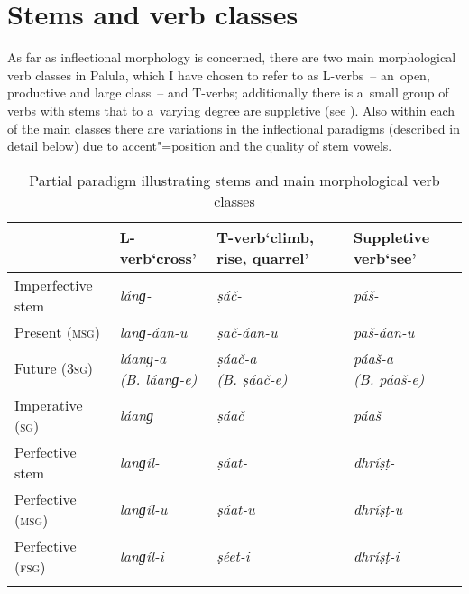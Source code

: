 \section{Stems and verb classes}
\label{sec:8-2}


As far as inflectional morphology is concerned, there are two main morphological verb classes in Palula, which I have chosen to refer to as L-verbs~-- an~open, productive and large class~-- and T-verbs; additionally there is a~small group of verbs with stems that to a~varying degree are suppletive (see ). Also within each of the main classes there are variations in the inflectional paradigms (described in detail below) due to accent"=position and the quality of stem vowels.


\begin{table}[ht]
\caption{Partial paradigm illustrating stems and main morphological verb classes}

\begin{tabularx}{\textwidth}{ l P{20mm} Q P{27mm} }
\lsptoprule
& L-verb\newline `cross' &
T-verb\newline `climb, rise, quarrel' &
Suppletive verb\newline `see'\\\hline
Imperfective stem &
\textit{lánɡ-} &
\textit{ṣáč-} &
\textit{páš-} \\
Present (\textsc{msg}) &
\textit{lanɡ-áan-u} &
\textit{ṣač-áan-u} &
\textit{paš-áan-u} \\
Future (\textsc{3sg}) &
\textit{láanɡ-a\newline (B. láanɡ-e)} &
\textit{ṣáač-a\newline (B. ṣáač-e)} &
\textit{páaš-a\newline (B. páaš-e)} \\
Imperative (\textsc{sg}) &
\textit{láanɡ} &
\textit{ṣáač} &
\textit{páaš} \\
Perfective stem &
\textit{lanɡíl-} &
\textit{ṣáat-} &
\textit{dhríṣṭ-} \\
Perfective (\textsc{msg}) &
\textit{lanɡíl-u} &
\textit{ṣáat-u} &
\textit{dhríṣṭ-u} \\
Perfective (\textsc{fsg}) &
\textit{lanɡíl-i} &
\textit{ṣéet-i} &
\textit{dhríṣṭ-i} \\\lspbottomrule
\end{tabularx}
\label{tab:8-3}
\end{table}


